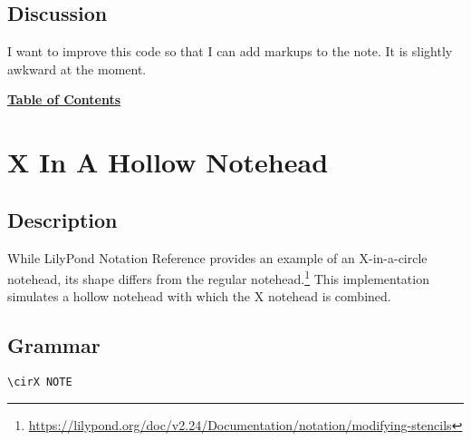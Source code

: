 \subsection{Discussion}
I want to improve this code so that I can add markups to the note. It is slightly awkward at the moment.


\hyperref[sec:toc]{\textbf{Table of Contents}}
\clearpage



\section {X In A Hollow Notehead}
\hfill

\subsection{Description}
While LilyPond Notation Reference provides an example of an X-in-a-circle notehead, its shape differs from the regular notehead.\footnote{\url{https://lilypond.org/doc/v2.24/Documentation/notation/modifying-stencils}} This implementation simulates a hollow notehead with which the X notehead is combined.

\subsection{Grammar}
\begin{verbatim}
\cirX NOTE
\end{verbatim}
